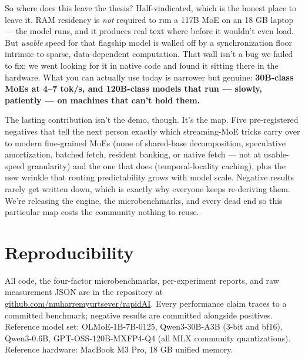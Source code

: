 \documentclass[11pt]{article}
\begin{document}
So where does this leave the thesis? Half-vindicated, which is the honest place to leave it. RAM residency is \emph{not} required to run a 117B MoE on an 18 GB laptop --- the model runs, and it produces real text where before it wouldn't even load. But \emph{usable} speed for that flagship model is walled off by a synchronization floor intrinsic to sparse, data-dependent computation. That wall isn't a bug we failed to fix; we went looking for it in native code and found it sitting there in the hardware. What you can actually use today is narrower but genuine: \textbf{30B-class MoEs at 4--7 tok/s, and 120B-class models that run --- slowly, patiently --- on machines that can't hold them.}

The lasting contribution isn't the demo, though. It's the map. Five pre-registered negatives that tell the next person exactly which streaming-MoE tricks carry over to modern fine-grained MoEs (none of shared-base decomposition, speculative amortization, batched fetch, resident banking, or native fetch --- not at usable-speed granularity) and the one that does (temporal-locality caching), plus the new wrinkle that routing predictability grows with model scale. Negative results rarely get written down, which is exactly why everyone keeps re-deriving them. We're releasing the engine, the microbenchmarks, and every dead end so this particular map costs the community nothing to reuse.

\section*{Reproducibility}

All code, the four-factor microbenchmarks, per-experiment reports, and raw measurement JSON are in the repository at \href{https://github.com/muharremyurtsever/rapidAI}{github.com/muharremyurtsever/rapidAI}. Every performance claim traces to a committed benchmark; negative results are committed alongside positives. Reference model set: OLMoE-1B-7B-0125, Qwen3-30B-A3B (3-bit and bf16), Qwen3-0.6B, GPT-OSS-120B-MXFP4-Q4 (all MLX community quantizations). Reference hardware: MacBook M3 Pro, 18 GB unified memory.
\end{document}
